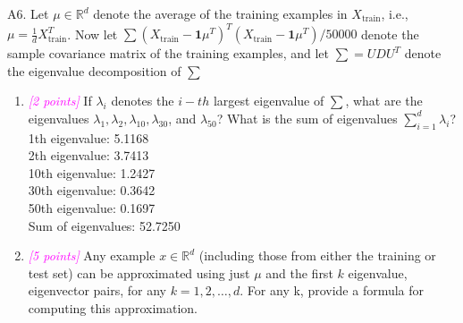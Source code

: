 \documentclass{article}
\newcommand{\field}[1]{\mathbb{#1}}
\newcommand{\1}{\mathbf{1}}
\newcommand{\R}{\field{R}} %
\newcommand{\points}[1]{\small\textcolor{magenta}{\emph{[#1 points]}} \normalsize}
\begin{document}
A6. Let $\mu\in\R^d$ denote the average of the training examples in $X_{\text{train}}$, i.e., $\mu = \frac{1}{d} X^T_{\text{train}}$. Now let $\sum (X_{\text{train}} - \1 \mu^T)^T (X_{\text{train}} - \1\mu^T)/50000$ denote the sample covariance matrix of the training examples, and let $\sum =UDU^T$ denote the eigenvalue decomposition of $\sum$
\begin{enumerate}
    \item \points{2} If $\lambda_i$ denotes the $i-th$ largest eigenvalue of $\sum$, what are the eigenvalues $\lambda_1, \lambda_2, \lambda_{10}, \lambda_{30}$, and $\lambda_{50}$? What is the sum of eigenvalues $\sum^d_{i=1}\lambda_i$? \\
    1th eigenvalue: 5.1168 \\
    2th eigenvalue: 3.7413 \\
    10th eigenvalue: 1.2427 \\
    30th eigenvalue: 0.3642 \\
    50th eigenvalue: 0.1697 \\
    Sum of eigenvalues: 52.7250 \\


    
    \item \points{5} Any example $x\in\R^d$ (including those from either the training or test set) can be approximated using just $\mu$ and the first $k$ eigenvalue, eigenvector pairs, for any $k=1,2,\hdots,d$.  For any k, provide a formula for computing this approximation.
    

\end{enumerate}
\end{document}
